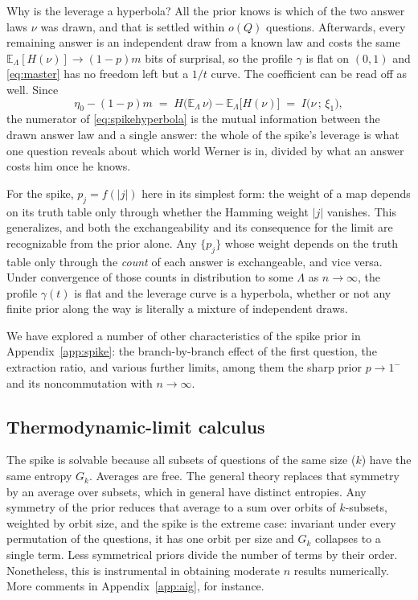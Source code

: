 \documentclass[11pt]{article}
\begin{document}
Why is the leverage a hyperbola? All the prior knows is which of the
two answer laws $\nu$ was drawn, and that is settled within $o(Q)$ questions. Afterwards, every remaining answer is an independent draw from a known law
and costs the same $\mathbb E_\Lambda[H(\nu)] \to (1-p)m$ bits of surprisal, so the
profile $\gamma$ is flat on $(0,1)$ and \eqref{eq:master} has no
freedom left but a $1/t$ curve. The coefficient can be read off as
well. Since
%
\begin{equation}
  \eta_0 - (1-p)m
  \;=\; H\big(\mathbb E_\Lambda\, \nu\big)
      - \mathbb E_\Lambda\big[H(\nu)\big]
  \;=\; I\big(\nu \,;\, \xi_1\big),
  \label{eq:spikejensen}
\end{equation}
%
the numerator of \eqref{eq:spikehyperbola} is the mutual information
between the drawn answer law and a single answer: the whole of the
spike's leverage is what one question reveals about which world Werner
is in, divided by what an answer costs him once he knows.

For the spike, $p_j = f(|j|)$ here in its simplest form: the weight of a map
depends on its truth table only through whether the Hamming weight $|j|$
vanishes. This generalizes, and both the exchangeability and its
consequence for the limit are recognizable from the prior alone. Any
$\{p_j\}$ whose weight depends on the truth table only through the
\emph{count} of each answer is exchangeable, and vice
versa. Under convergence of those counts in distribution to some
$\Lambda$ as $n \to \infty$, the profile $\gamma(t)$ is flat and the
leverage curve is a hyperbola, whether or not any finite prior along
the way is literally a mixture of independent draws.

We have explored a number of other characteristics of the spike
prior in Appendix~\ref{app:spike}: the branch-by-branch effect of
the first question, the extraction ratio, and various further
limits, among them the sharp prior $p \to 1^-$ and its
noncommutation with $n \to \infty$.

\subsection{Thermodynamic-limit calculus}\label{sec:tdlcalc}

The spike is solvable because all subsets of questions of the same size ($k$) have the
same entropy $G_k$. Averages are free. The general theory replaces that symmetry by an average
over subsets, which in general have distinct entropies.
Any symmetry of the prior reduces that average to a sum over orbits of
$k$-subsets, weighted by orbit size, and the spike is the extreme case:
invariant under every permutation of the questions, it has one orbit
per size and $G_k$ collapses to a single term. Less symmetrical priors
divide the number of terms by their order. Nonetheless, this is
instrumental in obtaining moderate $n$ results numerically. More
comments in Appendix~\ref{app:aig}, for instance.
\end{document}
